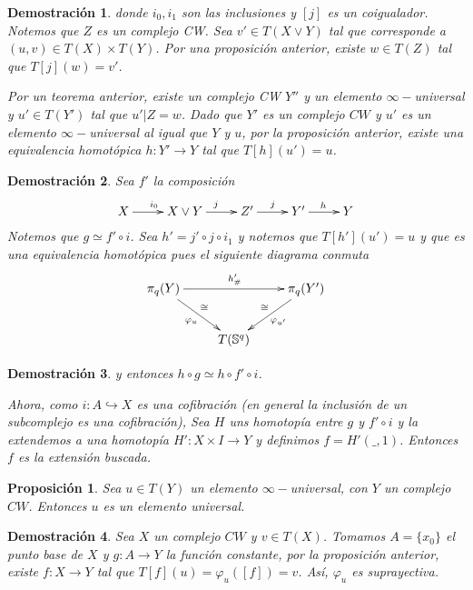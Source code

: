 \documentclass{beamer}
\newtheorem{pro}{Proposici\'on}
\newtheorem{dem}{Demostraci\'on}
\begin{document}
\begin{frame}
	\begin{dem}
		donde $i_0 ,i_1$ son las inclusiones y $[j]$ es un coigualador. Notemos que $Z$ es un complejo CW. Sea $v'\in T(X\vee Y)$ tal que corresponde a $(u,v)\in T(X)\times T(Y)$. Por una proposición anterior, existe $w\in T(Z)$ tal que $T[j](w)=v'$.
		
		Por un teorema anterior, existe un complejo CW $Y''$ y un elemento $\infty-$universal y $u'\in T(Y')$ tal que $u'|Z=w$. Dado que $Y'$ es un complejo $CW$ y $u'$ es un elemento $\infty-$universal al igual que $Y$ y $u$, por la proposición anterior, existe una equivalencia homotópica $h\colon Y'\to Y$ tal que $T[h](u')=u$.
	\end{dem}
\end{frame}

\begin{frame}
	\begin{dem}
		Sea $f'$ la composición
		\[\xymatrix{X\ar[r]^{i_0} & X\vee Y\ar[r]^j & Z\ar[r]^j' & Y'\ar[r]^h & Y}\]
		Notemos que $g\simeq f'\circ i$. Sea $h'=j'\circ j\circ i_1$ y notemos que $T[h'](u')=u$ y que es una equivalencia homotópica pues el siguiente diagrama conmuta
		\[\xymatrix{
		\pi_q(Y)\ar[rr]^{h_\# '} \ar[rd]_{\varphi_{u}}^\cong && \pi_q(Y')\ar[ld]^{\varphi_{u'}}_\cong\\
		& T(\mathbb{S}^q)		
		}\]
	\end{dem}
\end{frame}

\begin{frame}
	\begin{dem}
		y entonces $h\circ g\simeq h \circ f' \circ i$. 
		
		Ahora, como $i\colon A\hookrightarrow X$ es una cofibración (en general la inclusión de un subcomplejo es una cofibración), Sea $H$ uns homotopía entre $g$ y $f'\circ i$ y la extendemos a una homotopía $H'\colon X\times I\to Y$ y definimos $f=H'(\_,1)$. Entonces $f$ es la extensión buscada.
	\end{dem}
\end{frame}

\begin{frame}
	\begin{pro}
		Sea $u\in T(Y)$ un elemento $\infty-$universal, con $Y$ un complejo $CW$. Entonces $u$ es un elemento universal.
	\end{pro}
	
	\begin{dem}
		Sea $X$ un complejo $CW$ y $v\in T(X)$. Tomamos $A=\{x_0\}$ el punto base de $X$ y $g\colon A\to Y$ la función constante, por la proposición anterior, existe $f\colon X\to Y$ tal que $T[f](u)=\varphi_u ([f])=v$. Así, $\varphi_u$ es suprayectiva.
	\end{dem}
\end{frame}
\end{document}
